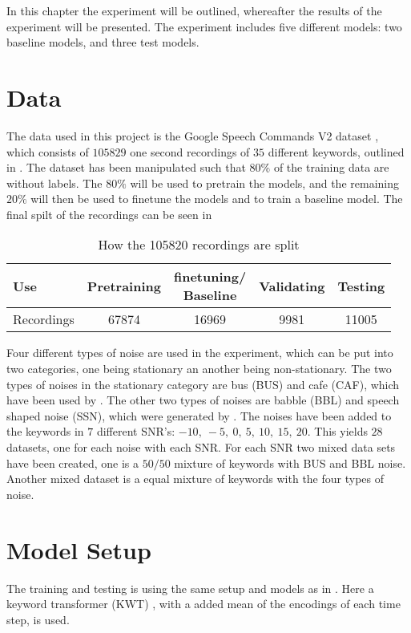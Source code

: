 In this chapter the experiment will be outlined, whereafter the results of the experiment will be presented. The experiment includes five different models: two baseline models, and three test models.

\section{Data}
The data used in this project is the Google Speech Commands V2 dataset \cite{warden2018speech}, which consists of \(105829\) one second recordings of \(35\) different keywords, outlined in . The dataset has been manipulated such that \(80\%\) of the training data are without labels. The \(80\%\) will be used to pretrain the models, and the remaining \(20\%\) will then be used to finetune the models and to train a baseline model. The final spilt of the recordings can be seen in 

\begin{table}[ht]
    \centering
    \begin{tabular}{@{}lcccc@{}}
        \toprule
        Use    & Pretraining & \makecell{ finetuning/ \\ Baseline } & Validating & Testing \\ \midrule
        Recordings   & 67874  & 16969 & 9981 & 11005 \\ 
        \bottomrule
    \end{tabular}
    \caption{How the 105820 recordings are split}
    \label{tab:data_split}
\end{table}

Four different types of noise are used in the experiment, which can be put into two categories, one being stationary an another being non-stationary. The two types of noises in the stationary category are bus (BUS) and cafe (CAF), which have been used by \cite{barker2015third}. The other two types of noises are babble (BBL) and speech shaped noise (SSN), which were generated by \cite{kolboek2016speech}. The noises have been added to the keywords in \(7\) different SNR's: \(-10, \ -5, \ 0, \ 5, \ 10, \ 15, \ 20\). This yields \(28\) datasets, one for each noise with each SNR.
For each SNR two mixed data sets have been created, one is a \(50/50\) mixture of keywords with BUS and BBL noise. Another mixed dataset is a equal mixture of keywords with the four types of noise.

\section{Model Setup}
The training and testing is using the same setup and models as in \cite{bovbjerg2023improving}. Here a keyword transformer (KWT) \cite{berg2021keyword}, with a added mean of the encodings of each time step, is used. 

